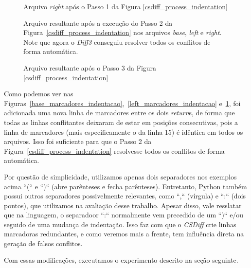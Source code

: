 \begin{figure}[ht]
	\begin{center}
		
		\caption{Arquivo \emph{right} após o Passo 1 da Figura
			\ref{csdiff_process_indentation}}\label{right_marcadores_indentacao}
	\end{center}
\end{figure}

\begin{figure}[ht]
	\begin{center}
		
		\caption{Arquivo resultante após a execução do Passo 2 da Figura~\ref{csdiff_process_indentation} nos arquivos
			\emph{base}, \emph{left} e \emph{right}. Note que agora o \emph{Diff3} conseguiu resolver todos
			os conflitos de forma automática.
		}\label{diff3_marcadores_indentacao}
	\end{center}
\end{figure}

\begin{figure}[ht]
	\begin{center}
		
		\caption{Arquivo resultante após o Passo 3 da Figura
			\ref{csdiff_process_indentation}}\label{csdiff_indentacao}
	\end{center}
\end{figure}

Como podemos ver nas
Figuras~\ref{base_marcadores_indentacao},~\ref{left_marcadores_indentacao}
e~\ref{right_marcadores_indentacao}, foi adicionada uma nova linha de
marcadores entre os dois \emph{return}s, de forma que todas as linhas
conflitantes deixaram de estar em posições consecutivas, pois a linha de
marcadores (mais especificamente o da linha 15) é idêntica em todos os
arquivos. Isso foi suficiente para que o Passo 2 da
Figura~\ref{csdiff_process_indentation} resolvesse todos os conflitos de forma
automática.

Por questão de simplicidade, utilizamos apenas dois separadores nos exemplos
acima ``(`` e ``)`` (abre parênteses e fecha parênteses). Entretanto, Python também possui outros separadores
possivelmente relevantes, como ``,`` (vírgula) e ``:`` (dois pontos), que
utilizamos na avaliação desse trabalho. Apesar disso, vale resslatar que na
linguagem, o separadoor ``:`` normalmente vem precedido de um ``)`` e/ou
seguido de uma mudança de indentação. Isso faz com que o \emph{CSDiff} crie
linhas marcadoras redundantes, e como veremos mais a frente, tem influência
direta na geração de falsos conflitos.

Com essas modificações, executamos o experimento descrito na seção seguinte.

